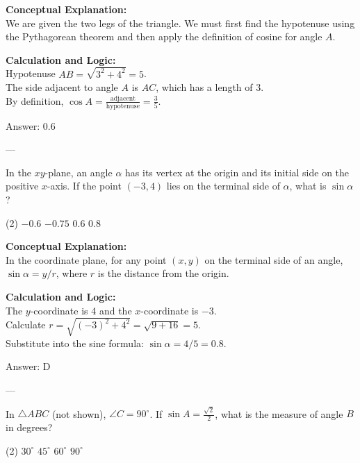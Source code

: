 \documentclass[11pt,paper=a4,answers]{exam}
\begin{document}
\begin{questions}
\begin{solution}
\textbf{Conceptual Explanation:} \\
We are given the two legs of the triangle. We must first find the hypotenuse using the Pythagorean theorem and then apply the definition of cosine for angle $A$.

\vspace{10pt}
\textbf{Calculation and Logic:} \\
Hypotenuse $AB = \sqrt{3^2 + 4^2} = 5$. \\
The side adjacent to angle $A$ is $AC$, which has a length of 3. \\
By definition, $\cos A = \frac{\text{adjacent}}{\text{hypotenuse}} = \frac{3}{5}$.

\vspace{15pt}
Answer: \colorbox{yellow!100}{0.6}
\end{solution}

---

\question
In the $xy$-plane, an angle $\alpha$ has its vertex at the origin and its initial side on the positive $x$-axis. If the point $(-3, 4)$ lies on the terminal side of $\alpha$, what is $\sin \alpha$?
\begin{tasks}(2)
    \task $-0.6$
    \task $-0.75$
    \task $0.6$
    \task $0.8$
\end{tasks}

\begin{solution}
\textbf{Conceptual Explanation:} \\
In the coordinate plane, for any point $(x, y)$ on the terminal side of an angle, $\sin \alpha = y/r$, where $r$ is the distance from the origin.

\vspace{10pt}
\textbf{Calculation and Logic:} \\
The $y$-coordinate is 4 and the $x$-coordinate is $-3$. \\
Calculate $r = \sqrt{(-3)^2 + 4^2} = \sqrt{9 + 16} = 5$. \\
Substitute into the sine formula: $\sin \alpha = 4/5 = 0.8$.

\vspace{15pt}
Answer: \colorbox{yellow!100}{D}
\end{solution}

% 

---

\question
In $\triangle ABC$ (not shown), $\angle C = 90^\circ$. If $\sin A = \frac{\sqrt{2}}{2}$, what is the measure of angle $B$ in degrees?
\begin{tasks}(2)
    \task $30^\circ$
    \task $45^\circ$
    \task $60^\circ$
    \task $90^\circ$
\end{tasks}


\end{questions}
\end{document}
